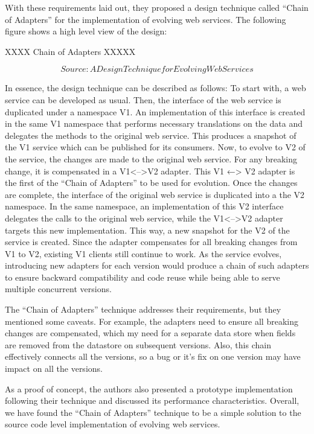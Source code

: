 \documentclass[runningheads,a4paper]{llncs}
\begin{document}
With these requirements laid out, they proposed a design technique called ``Chain of Adapters'' for the implementation of evolving web services. The following figure shows a high level view of the design:

XXXX Chain of Adapters XXXXX

\[Source: A Design Technique for Evolving Web Services \]

In essence, the design technique can be described as follows: To start with, a web service can be developed as usual. Then, the interface of the web service is duplicated under a namespace V1. An implementation of this interface is created in the same V1 namespace that performs necessary translations on the data and delegates the methods to the original web service. This produces a snapshot of the V1 service which can be published for its consumers.
Now, to evolve to V2 of the service, the changes are made to the original web service. For any breaking change, it is compensated in a V1<-->V2 adapter. This V1 ←> V2 adapter is the first of the ``Chain of Adapters'' to be used for evolution. Once the changes are complete, the interface of the original web service is duplicated into a the V2 namespace. In the same namespace, an implementation of this V2 interface delegates the calls to the original web service, while the V1<-->V2 adapter targets this new implementation. This way, a new snapshot for the V2 of the service is created. Since the adapter compensates for all breaking changes from V1 to V2, existing V1 clients still continue to work. As the service evolves, introducing new adapters for each version would produce a chain of such adapters to ensure backward compatibility and code reuse while being able to serve multiple concurrent versions.

The ``Chain of Adapters'' technique addresses their requirements, but they mentioned some caveats. For example, the adapters need to ensure all breaking changes are compensated, which my need for a separate data store when fields are removed from the datastore on subsequent versions. Also, this chain effectively connects all the versions, so a bug or it’s fix on one version may have impact on all the versions.

As a proof of concept, the authors also presented a prototype implementation following their technique and discussed its performance characteristics. Overall, we have found the ``Chain of Adapters'' technique to be a simple solution to the source code level implementation of evolving web services.
\end{document}
